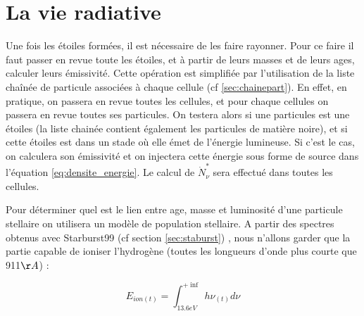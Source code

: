 

\section{La vie radiative}


Une fois les étoiles formées, il est nécessaire de les faire rayonner.
Pour ce faire il faut passer en revue toute les étoiles, et à partir de leurs masses et de leurs ages, calculer leurs émissivité.
Cette opération est simplifiée par l'utilisation de la liste chaînée de particule associées à chaque cellule (cf \ref{sec:chainepart}).
En effet, en pratique, on passera en revue toutes les cellules, et pour chaque cellules on passera en revue toutes ses particules.
On testera alors si une particules est une étoiles (la liste chainée contient également les particules de matière noire), et si cette étoiles est dans un stade où elle émet de l'énergie lumineuse.
Si c'est le cas, on calculera son émissivité et on injectera cette énergie sous forme de source dans l'équation \ref{eq:densite_energie}.
Le calcul de $\dot{N}_\nu^*$ sera effectué dans toutes les cellules.

Pour déterminer quel est le lien entre age, masse et luminosité d'une particule stellaire on utilisera un modèle de population stellaire.
A partir des spectres obtenus avec Starburst99 (cf section \ref{sec:staburst}) , nous n'allons garder que la partie capable de ioniser l'hydrogène (toutes les longueurs d'onde plus courte que 911$\AA$) :

\begin{equation}
E_{ion (t)} = \int_{13.6eV}^{+\inf} h \nu_{(t)} d\nu
\end{equation}

